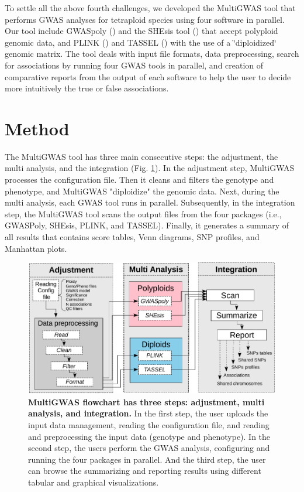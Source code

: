 \documentclass{article}
\begin{document}
To settle all the above fourth challenges, we developed the MultiGWAS tool that performs GWAS analyses for tetraploid species using four software in parallel. Our tool include GWASpoly (\cite{Rosyara2016}) and the SHEsis tool (\cite{Shen2016}) that accept polyploid genomic data, and PLINK (\cite{Purcell2007}) and TASSEL (\cite{Bradbury2007}) with the use of a \char`\"{}diploidized\char`\"{} genomic matrix. The tool deals with input file formats, data preprocessing, search for associations by running four GWAS tools in parallel, and creation of comparative reports from the output of each software to help the user to decide more intuitively the true or false associations.

\section{Method}

The MultiGWAS tool has three main consecutive steps: the adjustment, the multi analysis, and the integration (Fig. \ref{fig:Pipeline}). In the adjustment step, MultiGWAS processes the configuration file. Then it cleans and filters the genotype and phenotype, and  MultiGWAS "diploidize" the genomic data. Next, during the multi analysis, each GWAS tool runs in parallel. Subsequently, in the integration step, the MultiGWAS tool scans the output files from the four packages (i.e., GWASPoly, SHEsis, PLINK, and TASSEL). Finally, it generates a summary of all results that contains score tables, Venn diagrams, SNP profiles, and Manhattan plots. 
\begin{figure}
\centering{}\includegraphics[width=12cm]{images/paper-multiGWAS-flowchart-stages} \caption{\textbf{MultiGWAS flowchart has three steps: adjustment, multi analysis, and integration.} In the first step, the user uploads the input data management, reading the configuration file, and reading and preprocessing the input data (genotype and phenotype). In the second step, the users perform the GWAS analysis, configuring and running the four packages in parallel. And the third step, the user can browse the summarizing and reporting results using different tabular and graphical visualizations.\label{fig:Pipeline}}
\end{figure}
\end{document}
